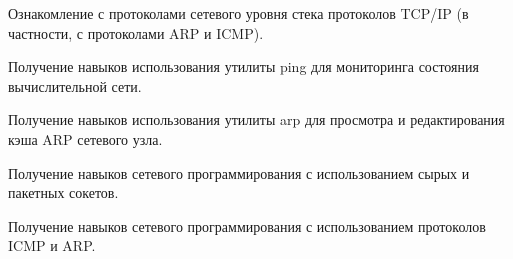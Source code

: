 
Ознакомление с протоколами сетевого уровня стека протоколов TCP/IP (в частности, с протоколами ARP и ICMP).

Получение навыков использования утилиты ping для мониторинга состояния вычислительной сети.

Получение навыков использования утилиты arp для просмотра и редактирования кэша ARP сетевого узла.

Получение навыков сетевого программирования с использованием сырых и пакетных сокетов.

Получение навыков сетевого программирования с использованием протоколов ICMP и ARP.


